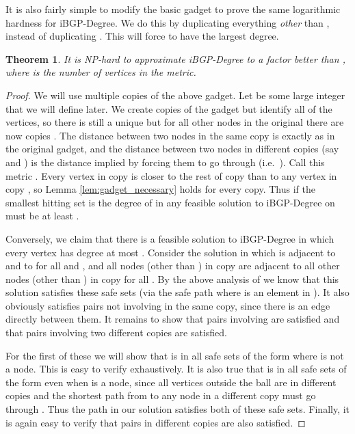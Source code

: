 \documentclass[11pt,letterpaper]{article}
\newtheorem{theorem}{Theorem}[section]
\theoremstyle{definition}
\begin{document}
It is also fairly simple to modify the basic gadget to prove the same logarithmic hardness for {\sc iBGP-Degree}.  We do this by duplicating everything \emph{other} than , instead of duplicating .  This will force  to have the largest degree.

\begin{theorem}
\label{thm:iBGP_deghard}
  It is NP-hard to approximate {\sc iBGP-Degree} to a factor better than
  , where  is the number of vertices in the
  metric.
\end{theorem}
\begin{proof}
  We will use multiple copies of the above gadget.  Let  be some
  large integer that we will define later.  We create  copies
  of the gadget but identify all of the  vertices, so there is
  still a unique  but for all other nodes  in the original there
  are now  copies .  The distance
  between two nodes in the same copy is exactly as in the original
  gadget, and the distance between two nodes in different copies (say
   and ) is the distance implied by forcing them to go
  through  (i.e.~).  Call this
  metric .  Every vertex in copy  is closer to the rest
  of copy  than to any vertex in copy , so Lemma
  \ref{lem:gadget_necessary} holds for every copy.  Thus if the
  smallest hitting set is  the degree of  in any feasible
  solution to {\sc iBGP-Degree} on  must be at least .

  Conversely, we claim that there is a feasible solution to {\sc
    iBGP-Degree} in which every vertex has degree at most
  .  Consider the solution in which  is adjacent to
   and to  for all  and , and all
  nodes (other than ) in copy  are adjacent to all other nodes
  (other than ) in copy  for all .  By the above
  analysis of  we know that this solution satisfies
  these safe sets (via the safe path  where 
  is an element in ).  It also obviously satisfies pairs not
  involving  in the same copy, since there is an edge directly
  between them.  It remains to show that pairs involving  are
  satisfied and that pairs involving two different copies are
  satisfied.

  For the first of these we will show that  is in all safe sets of
  the form  where  is not a  node.  This is easy to
  verify exhaustively.  It is also true that  is
  in all safe sets of the form  even when  is a  node,
  since all vertices outside the ball  are in
  different copies and the shortest path from  to any node in a
  different copy must go through .  Thus the path  in our
  solution satisfies both of these safe sets.  Finally, it is again easy to verify that
  pairs in different copies are also satisfied.


\end{proof}
\end{document}
